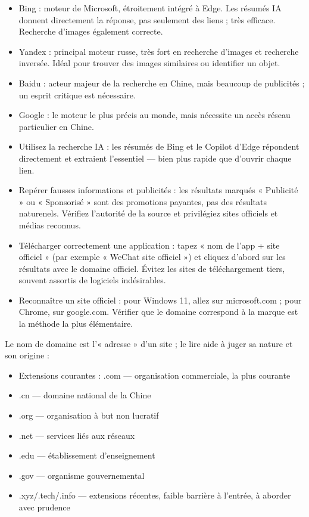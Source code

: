 \begin{itemize}
  \item Bing : moteur de Microsoft, étroitement intégré à Edge. Les résumés IA donnent directement la réponse, pas seulement des liens ; très efficace. Recherche d'images également correcte.
  \item Yandex : principal moteur russe, très fort en recherche d'images et recherche inversée. Idéal pour trouver des images similaires ou identifier un objet.
  \item Baidu : acteur majeur de la recherche en Chine, mais beaucoup de publicités ; un esprit critique est nécessaire.
  \item Google : le moteur le plus précis au monde, mais nécessite un accès réseau particulier en Chine.
\end{itemize}


\begin{itemize}
  \item Utilisez la recherche IA : les résumés de Bing et le Copilot d'Edge répondent directement et extraient l'essentiel — bien plus rapide que d'ouvrir chaque lien.
  \item Repérer fausses informations et publicités : les résultats marqués « Publicité » ou « Sponsorisé » sont des promotions payantes, pas des résultats naturenels. Vérifiez l'autorité de la source et privilégiez sites officiels et médias reconnus.
  \item Télécharger correctement une application : tapez « nom de l'app + site officiel » (par exemple « WeChat site officiel ») et cliquez d'abord sur les résultats avec le domaine officiel. Évitez les sites de téléchargement tiers, souvent assortis de logiciels indésirables.
  \item Reconnaître un site officiel : pour Windows 11, allez sur microsoft.com ; pour Chrome, sur google.com. Vérifier que le domaine correspond à la marque est la méthode la plus élémentaire.
\end{itemize}


Le nom de domaine est l'« adresse » d'un site ; le lire aide à juger sa nature et son origine :

\begin{itemize}
  \item Extensions courantes : .com — organisation commerciale, la plus courante
  \item .cn — domaine national de la Chine
  \item .org — organisation à but non lucratif
  \item .net — services liés aux réseaux
  \item .edu — établissement d'enseignement
  \item .gov — organisme gouvernemental
  \item .xyz/.tech/.info — extensions récentes, faible barrière à l'entrée, à aborder avec prudence
\end{itemize}

